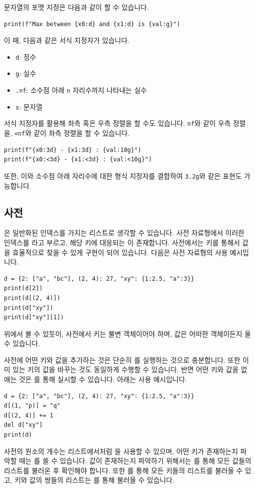 \documentclass[../main.tex]{subfiles}
\begin{document}
문자열의 포맷 지정은 다음과 같이 할 수 있습니다.
\begin{verbatim}
print(f"Max between {x0:d} and {x1:d} is {val:g}")
\end{verbatim}
이 때, 다음과 같은 서식 지정자가 있습니다.
\begin{itemize}
    \item \texttt{d}: 정수
    \item \texttt{g}: 실수
    \item \texttt{.nf}: 소수점 아래 \texttt{n} 자리수까지 나타내는 실수
    \item \texttt{s}: 문자열
\end{itemize}
서식 지정자를 활용해 좌측 혹은 우측 정렬을 할 수도 있습니다.
\texttt{nf}와 같이 우측 정렬을, \texttt{<nf}와 같이 좌측 정렬을 할 수 있습니다.
\begin{verbatim}
print(f"{x0:3d} - {x1:3d} : {val:10g}")
print(f"{x0:<3d} - {x1:<3d} : {val:<10g}")
\end{verbatim}
또한, 이와 소수점 아래 자리수에 대한 형식 지정자를 결합하여 \texttt{3.2g}와 같은 표현도 가능합니다.

\subsection{사전}
은 일반화된 인덱스를 가지는 리스트로 생각할 수 있습니다.
사전 자료형에서 이러한 인덱스를 라고 부르고, 해당 키에 대응되는 이 존재합니다.
사전에서는 키를 통해서 값을 효율적으로 찾을 수 있게 구현이 되어 있습니다.
다음은 사전 자료형의 사용 예시입니다.
\begin{verbatim}
d = {2: ["a", "bc"], (2, 4): 27, "xy": {1:2.5, "a":3}}
print(d[2])
print(d[(2, 4)])
print(d["xy"])
print(d["xy"][1])
\end{verbatim}
위에서 볼 수 있듯이, 사전에서 키는 불변 객체이어야 하며, 값은 어떠한 객체이든지 올 수 있습니다.

사전에 어떤 키와 값을 추가하는 것은 단순히 를 실행하는 것으로 충분합니다.
또한 이미 있는 키의 값을 바꾸는 것도 동일하게 수행할 수 있습니다.
반면 어떤 키와 값을 없애는 것은 를 통해 실시할 수 있습니다.
아래는 사용 예시입니다.
\begin{verbatim}
d = {2: ["a", "bc"], (2, 4): 27, "xy": {1:2.5, "a":3}}
d[(1, "p)] = "q"
d[(2, 4)] += 1
del d["xy"]
print(d)
\end{verbatim}

사전의 원소의 개수는 리스트에서처럼 을 사용할 수 있으며, 어떤 키가 존재하는지 파악할 때는 를 쓸 수 있습니다.
값이 존재하는지 파악하기 위해서는 를 통해 모든 값들의 리스트를 불러온 후 확인해야 합니다.
또한 를 통해 모든 키들의 리스트를 불러올 수 있고, 키와 값의 쌍들의 리스트는 를 통해 불러올 수 있습니다.
\end{document}
